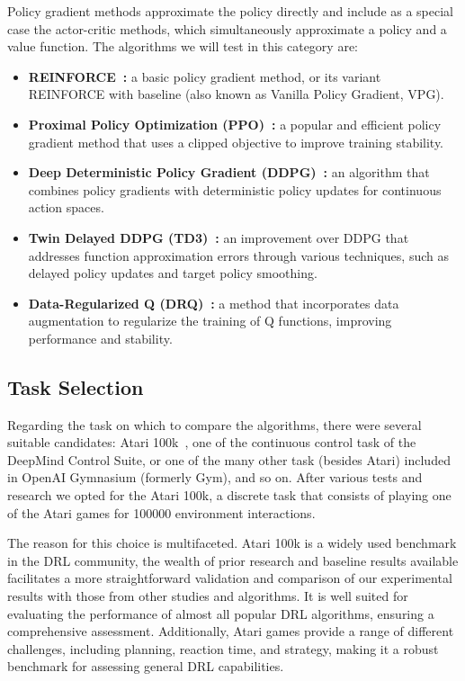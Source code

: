 Policy gradient methods approximate the policy directly and include as a special case the actor-critic methods, which simultaneously approximate a policy and a value function. The algorithms we will test in this category are:
\begin{itemize}
	\item \textbf{REINFORCE~\cite[Chapter~13]{sutton:rl}:} a basic policy gradient method, or its variant REINFORCE with baseline (also known as Vanilla Policy Gradient, VPG).
	\item \textbf{Proximal Policy Optimization (PPO)~\cite{schulman:ppo}:} a popular and efficient policy gradient method that uses a clipped objective to improve training stability.
	\item \textbf{Deep Deterministic Policy Gradient (DDPG)~\cite{lillicrap:ddpg}:} an algorithm that combines policy gradients with deterministic policy updates for continuous action spaces.
	\item \textbf{Twin Delayed DDPG (TD3)~\cite{fujimoto:td3}:} an improvement over DDPG that addresses function approximation errors through various techniques, such as delayed policy updates and target policy smoothing.
	\item \textbf{Data-Regularized Q (DRQ)~\cite{kostrikov:drq}:} a method that incorporates data augmentation to regularize the training of Q functions, improving performance and stability.
\end{itemize}


\subsection{Task Selection}
\label{subsec:task_selection}

Regarding the task on which to compare the algorithms, there were several suitable candidates: Atari 100k~\cite{kaiser:atari100k}, one of the continuous control task of the DeepMind Control Suite, or one of the many other task (besides Atari) included in OpenAI Gymnasium (formerly Gym), and so on. After various tests and research we opted for the Atari 100k, a discrete task that consists of playing one of the Atari games for \num{100000} environment interactions.

The reason for this choice is multifaceted. Atari 100k is a widely used benchmark in the DRL community, the wealth of prior research and baseline results available facilitates a more straightforward validation and comparison of our experimental results with those from other studies and algorithms. It is well suited for evaluating the performance of almost all popular DRL algorithms, ensuring a comprehensive assessment. Additionally, Atari games provide a range of different challenges, including planning, reaction time, and strategy, making it a robust benchmark for assessing general DRL capabilities.

